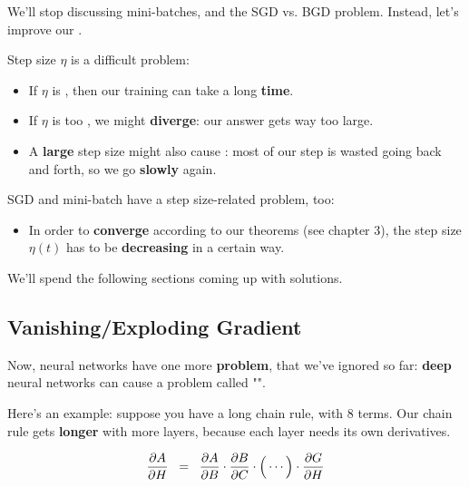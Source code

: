         We'll stop discussing mini-batches, and the SGD vs. BGD problem. Instead, let's improve our .
        
        Step size $\eta$ is a difficult problem:
        
        \begin{itemize}
            \item If $\eta$ is , then our training can take a long \textbf{time}.
            
            \item If $\eta$ is too , we might \textbf{diverge}: our answer gets way too large.
            
            \item A \textbf{large} step size might also cause : most of our step is wasted going back and forth, so we go \textbf{slowly} again.
        \end{itemize}
        
        SGD and mini-batch have a step size-related problem, too:
        
        \begin{itemize}
            \item In order to \textbf{converge} according to our theorems (see chapter 3), the step size $\eta(t)$ has to be \textbf{decreasing} in a certain way.
        \end{itemize}

        We'll spend the following sections coming up with solutions.
    
    \secdiv

    
    \pagebreak
    \subsection{Vanishing/Exploding Gradient}
    
        Now, neural networks have one more \textbf{problem}, that we've ignored so far: \textbf{deep} neural networks can cause a problem called "".
        
        Here's an example: suppose you have a long chain rule, with 8 terms. Our chain rule gets \textbf{longer} with more layers, because each layer needs its own derivatives.
        
        \begin{equation}
            \frac{\partial A}{\partial H}
            \;\;=\;\;
            \frac{\partial A}{\partial B}
            \cdot
            \frac{\partial B}{\partial C}
            \cdot
            \Big(
            \cdots
            \Big)
            \cdot
            \frac{\partial G}{\partial H}
        \end{equation}
        
